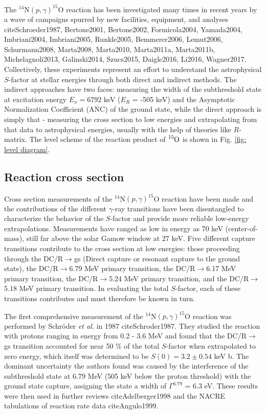 The $^{14}$N$\left( p,\gamma \right) ^{15}$O reaction has been investigated many times in recent years by a wave of campaigns spurred by new facilities, equipment, and analyses cite{Schroeder1987, Bertone2001, Bertone2002, Formicola2004, Yamada2004, Imbriani2004, Imbriani2005, Runkle2005, Bemmerer2006, Lemut2006, Schurmann2008, Marta2008, Marta2010, Marta2011a, Marta2011b, Michelagnoli2013, Galinski2014, Szucs2015, Daigle2016, Li2016, Wagner2017}. Collectively, these experiments represent an effort to understand the astrophysical $S$-factor at stellar energies through both direct and indirect methods. The indirect approaches have two faces: measuring the width of the subthreshold state at excitation energy $E_{x} =6792$ keV ($E_{R}$ = -505 keV) and the Asymptotic Normalization Coefficient (ANC) of the ground state, while the direct approach is simply that - measuring the cross section to low energies and extrapolating from that data to astrophysical energies, usually with the help of theories like $R$-matrix. The level scheme of the reaction product of $\ce{^{15}O}$ is shown in Fig. \ref{fig: level diagram}.

\subsection{Reaction cross section}

Cross section measurements of the $^{14}$N$\left( p,\gamma \right) ^{15}$O reaction have been made and the contributions of the different $\gamma$-ray transitions have been disentangled to characterize the behavior of the $S$-factor  and provide more reliable low-energy extrapolations. Measurements have ranged as low in energy as 70 keV (center-of-mass), still far above the solar Gamow window at 27 keV. Five different capture transitions contribute to the cross section at low energies: those proceeding through the DC/R$\rightarrow$gs (Direct capture or resonant capture to the ground state), the DC/R$\rightarrow$6.79 MeV primary transition, the DC/R$\rightarrow$6.17 MeV primary transition, the DC/R$\rightarrow$5.24 MeV primary transition, and the DC/R$\rightarrow$5.18 MeV primary transition. In evaluating the total $S$-factor, each of these transitions contributes and must therefore be known in turn. 

The first comprehensive measurement of the $^{14}$N$\left( p,\gamma \right) ^{15}$O reaction was performed by Schr{\"o}der \textit{et al.} in 1987 cite{Schroder1987}. They studied the reaction with protons ranging in energy from 0.2 - 3.6 MeV and found that the DC/R$\rightarrow$gs transition accounted for near 50 \% of the total $S$-factor when extrapolated to zero energy, which itself was determined to be $S(0) = 3.2 \pm 0.54$ keV b. The dominant uncertainty the authors found was caused by the interference of the subthreshold state at 6.79 MeV (505 keV below the proton threshold) with the ground state capture, assigning the state a width of $\Gamma^{6.79}$ = 6.3 eV. These results were then used in further reviews cite{Adelberger1998} and the NACRE tabulations of reaction rate data cite{Angulo1999}. 

